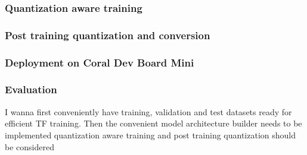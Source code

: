 {\subsubsection{Quantization aware training}
\subsubsection{Post training quantization and conversion}
\subsubsection{Deployment on Coral Dev Board Mini}
\subsubsection{Evaluation}
I wanna first conveniently have training, validation and test datasets ready for efficient TF training.
Then the convenient model architecture builder needs to be implemented
quantization aware training and post training quantization should be considered

}